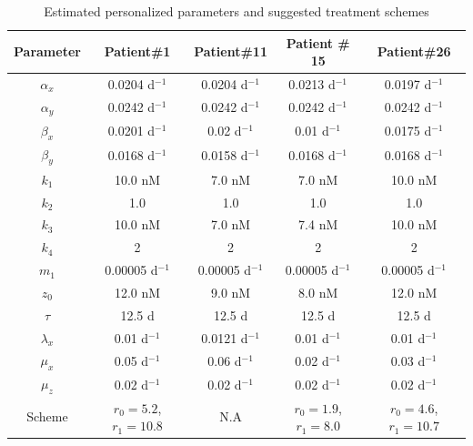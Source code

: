\begin{table}[t]
\caption{Estimated personalized parameters and suggested treatment schemes \label{prostate2}}
\centering
\small
\begin{tabular}{|c|c|c|c|c|}
\hline\hline
Parameter  & Patient\#1 & Patient\#11 & Patient \# 15 & Patient\#26  \\\hline\hline
$\alpha_x$ & 0.0204 d$^{-1}$ & 0.0204 d$^{-1}$ & 0.0213 d$^{-1}$& 0.0197 d$^{-1}$ \\
$\alpha_y$ & 0.0242 d$^{-1}$ &  0.0242 d$^{-1}$&  0.0242 d$^{-1}$&  0.0242 d$^{-1}$  \\
$\beta_x$  & 0.0201 d$^{-1}$ & 0.02 d$^{-1}$ & 0.01 d$^{-1}$& 0.0175 d$^{-1}$ \\
$\beta_y$  & 0.0168 d$^{-1}$ &0.0158 d$^{-1}$ &0.0168 d$^{-1}$ &0.0168 d$^{-1}$  \\
$k_1$     & 10.0 nM & 7.0 nM & 7.0 nM& 10.0 nM  \\
$k_2$     & 1.0 & 1.0 & 1.0 & 1.0 \\
$k_3$     & 10.0 nM & 7.0 nM & 7.4 nM& 10.0 nM  \\
$k_4$     &  2 & 2 & 2 & 2   \\
$m_1$     & 0.00005 d$^{-1}$ &  0.00005 d$^{-1}$ &  0.00005 d$^{-1}$ &  0.00005 d$^{-1}$  \\
$z_0$     & 12.0 nM & 9.0 nM & 8.0 nM & 12.0 nM  \\
$\tau$     & 12.5 d & 12.5 d & 12.5 d & 12.5 d  \\
$\lambda_x$     & 0.01 d$^{-1}$ & 0.0121 d$^{-1}$ & 0.01 d$^{-1}$ & 0.01 d$^{-1}$ \\
$\mu_x$     & 0.05 d$^{-1}$ & 0.06 d$^{-1}$ & 0.02 d$^{-1}$ & 0.03 d$^{-1}$\\
$\mu_z$     & 0.02 d$^{-1}$ & 0.02 d$^{-1}$  & 0.02 d$^{-1}$ & 0.02 d$^{-1}$  \\
\hline\hline
Scheme     & $r_0=5.2$, $r_1=10.8$ & N.A & $r_0=1.9$, $r_1=8.0$ & $r_0=4.6$, $r_1=10.7$ \\
\hline\hline
\end{tabular}
 \vspace{-0.3cm}
\end{table}



